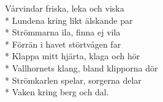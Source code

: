 \begin{SongText}
    \begin{SongVerse}
        Vårvindar friska, leka och viska\\*%
        Lundena kring likt älskande par\\*%
        Strömmarna ila, finna ej vila\\*%
        Förrän i havet störtvågen far\\*%
        Klappa mitt hjärta, klaga och hör\\*%
        Vallhornets klang, bland klipporna dör\\*%
        Strömkarlen spelar, sorgerna delar\\*%
        Vaken kring berg och dal.
    \end{SongVerse}
\end{SongText}